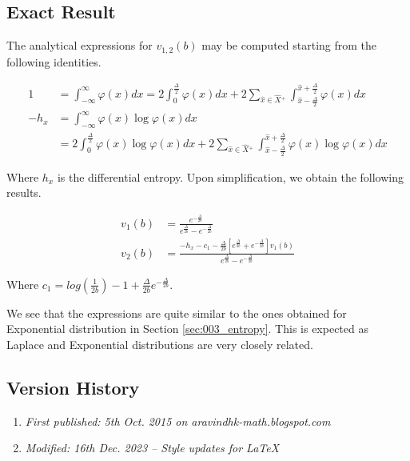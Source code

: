 \subsection{Exact Result}

The analytical expressions for $v_{1,2}(b)$ may be computed starting from the following identities.

\begin{align} 1 &= \int_{-\infty}^{\infty} \varphi(x) dx = 2 \int_{0}^{\frac{\Delta}{2}} \varphi(x) dx + 2 \sum_{\hat{x} \in \hat{X}{}^+} \int_{\hat{x} - \frac{\Delta}{2}}^{\hat{x} + \frac{\Delta}{2}} \varphi(x) dx \\ -h_x &= \int_{-\infty}^{\infty} \varphi(x) \log \varphi(x) dx  \nonumber\\ &= 2 \int_{0}^{\frac{\Delta}{2}} \varphi(x) \log \varphi(x) dx + 2 \sum_{\hat{x} \in \hat{X}{}^+} \int_{\hat{x} - \frac{\Delta}{2}}^{\hat{x} + \frac{\Delta}{2}} \varphi(x) \log \varphi(x) dx \end{align}

Where $h_x$ is the differential entropy. Upon simplification, we obtain the following results.

\begin{align} v_1(b) &= \frac{e^{-\frac{\Delta}{2b}}}{e^{\frac{\Delta}{2b}} - e^{-\frac{\Delta}{2b}}} \\ v_2(b) &= \frac{-h_x - c_1 - \frac{\Delta}{2b} \left[ e^{\frac{\Delta}{2b}} + e^{-\frac{\Delta}{2b}} \right] v_1(b)}{e^{\frac{\Delta}{2b}} - e^{-\frac{\Delta}{2b}}}\end{align}

Where $c_1 = log\left(\frac{1}{2b}\right) - 1 + \frac{\Delta}{2b}e^{-\frac{\Delta}{2b}}$.

We see that the expressions are quite similar to the ones obtained for Exponential distribution in Section \ref{sec:003_entropy}. This is expected as Laplace and Exponential distributions are very closely related.

\subsection{Version History}
\begin{enumerate}
	\item \emph{First published: 5th Oct. 2015 on aravindhk-math.blogspot.com}
	\item \emph{Modified: 16th Dec. 2023 -- Style updates for \LaTeX}
\end{enumerate}


